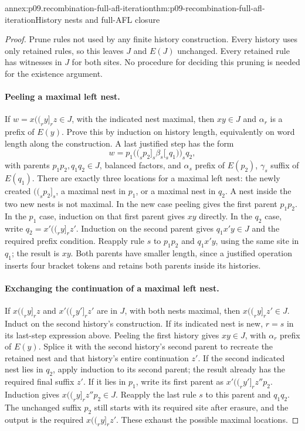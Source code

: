 \begin{annexitem}{annex:p09.recombination-full-afl-iteration}{thm:p09-recombination-full-afl-iteration}{History nests and full-AFL closure}
\begin{proof}
Prune rules not used by any finite history construction. Every history
uses only retained rules, so this leaves \(J\) and \(E(J)\) unchanged.
Every retained rule has witnesses in \(J\) for both sites. No procedure
for deciding this pruning is needed for the existence argument.

\paragraph{Peeling a maximal left nest.}
If \(w=x\mathopen{(\!(}_ry]_rz\in J\), with the indicated nest maximal, then
\(xy\in J\) and \(\alpha_r\) is a prefix of \(E(y)\).
Prove this by induction on history length, equivalently on word length
along the construction. A last justified step has the form
\[
 w=p_1\mathopen{(\!(}_sp_2]_s\beta_s[_sq_1\mathclose{)\!)}_sq_2,
\]
with parents \(p_1p_2,q_1q_2\in J\), balanced factors, and
\(\alpha_s\) prefix of \(E(p_2)\), \(\gamma_s\) suffix of \(E(q_1)\).
There are exactly three locations for a maximal left nest:
the newly created \(\mathopen{(\!(}_sp_2]_s\), a maximal nest in \(p_1\),
or a maximal nest in \(q_2\). A nest inside the two new nests is not maximal.
In the new case peeling gives the first parent \(p_1p_2\).
In the \(p_1\) case, induction on that first parent gives \(xy\) directly.
In the \(q_2\) case, write \(q_2=x'\mathopen{(\!(}_ry]_rz'\).
Induction on the second parent gives \(q_1x'y\in J\) and the required
prefix condition. Reapply rule \(s\) to \(p_1p_2\) and \(q_1x'y\),
using the same site in \(q_1\); the result is \(xy\).
Both parents have smaller length, since a justified operation inserts
four bracket tokens and retains both parents inside its histories.

\paragraph{Exchanging the continuation of a maximal left nest.}
If \(x\mathopen{(\!(}_ry]_rz\) and \(x'\mathopen{(\!(}_ry']_rz'\) are in \(J\), with both nests
maximal, then \(x\mathopen{(\!(}_ry]_rz'\in J\).
Induct on the second history's construction. If its indicated nest is
new, \(r=s\) in its last-step expression above. Peeling the first history
gives \(xy\in J\), with \(\alpha_r\) prefix of \(E(y)\).
Splice it with the second history's second parent to recreate the retained
nest and that history's entire continuation \(z'\).
If the second indicated nest lies in \(q_2\), apply induction to its
second parent; the result already has the required final suffix \(z'\).
If it lies in \(p_1\), write its first parent as
\(x'\mathopen{(\!(}_ry']_rz''p_2\). Induction gives
\(x\mathopen{(\!(}_ry]_rz''p_2\in J\). Reapply the last rule \(s\) to this parent
and \(q_1q_2\). The unchanged suffix \(p_2\) still starts with its
required site after erasure, and the output is the required
\(x\mathopen{(\!(}_ry]_rz'\). These exhaust the possible maximal locations.


\end{proof}
\end{annexitem}
